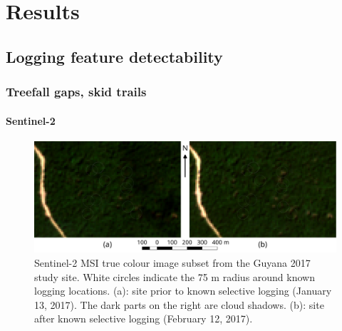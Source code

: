 \documentclass[a4paper,12pt]{scrbook}
\begin{document}
\chapter{Results}

\section{Logging feature detectability}

\subsection{Treefall gaps, skid trails}


\subsubsection{Sentinel-2}
\label{sec-treefall-sentinel2}

\begin{figure}
  \centering
  \includegraphics[width=\textwidth]{thesis-figures/02-guyana-sentinel2-tci}
  \caption{Sentinel-2 \ac{MSI} true colour image subset from the Guyana 2017 study site. White circles indicate the 75 m radius around known logging locations. (a): site prior to known selective logging (January 13, 2017). The dark parts on the right are cloud shadows. (b): site after known selective logging (February 12, 2017).}
  \label{fig-guyana-sentinel2-tci}
\end{figure}
\end{document}
